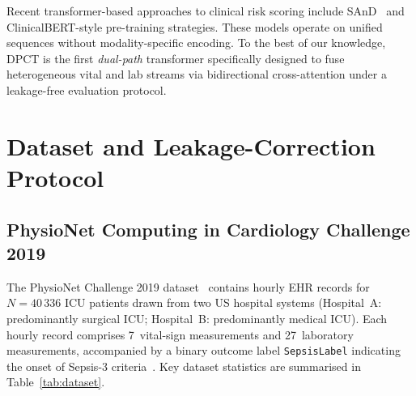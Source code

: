 \documentclass[conference,12pt]{IEEEtran}
\newcommand{\dpct}{\textsc{DPCT}}
\newcommand{\tab}[1]{Table~\ref{#1}}
\begin{document}
Recent transformer-based approaches to clinical risk scoring include
SAnD~\cite{sand2018} and ClinicalBERT-style pre-training strategies.
These models operate on unified sequences without modality-specific encoding.
To the best of our knowledge, \dpct{} is the first \emph{dual-path} transformer
specifically designed to fuse heterogeneous vital and lab streams via
bidirectional cross-attention under a leakage-free evaluation protocol.

\section{\textbf{Dataset and Leakage-Correction Protocol}}
\label{sec:data}

\subsection{\textbf{PhysioNet Computing in Cardiology Challenge 2019}}
\label{sec:data:physionet}

The PhysioNet Challenge 2019 dataset~\cite{reyna2019} contains hourly EHR
records for $N = 40\,336$ ICU patients drawn from two US hospital systems
(Hospital~A: predominantly surgical ICU; Hospital~B: predominantly medical ICU).
Each hourly record comprises 7~vital-sign measurements and 27~laboratory
measurements, accompanied by a binary outcome label \texttt{SepsisLabel}
indicating the onset of Sepsis-3 criteria~\cite{singer2016}.
Key dataset statistics are summarised in \tab{tab:dataset}.
\end{document}

